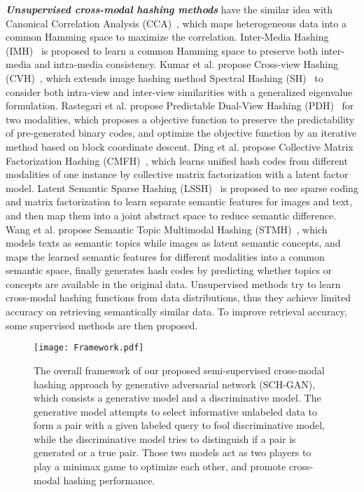 \documentclass[journal]{IEEEtran}
\begin{document}
\textit{\textbf{Unsupervised cross-modal hashing methods}} have the similar idea with Canonical Correlation Analysis (CCA)~\cite{cca}, which maps heterogeneous data into a common Hamming space to maximize the correlation. Inter-Media Hashing (IMH)~\cite{imh} is proposed to learn a common Hamming space to preserve both inter-media and intra-media consistency. Kumar et al. propose Cross-view Hashing (CVH)~\cite{cvh}, which extends image hashing method Spectral Hashing (SH)~\cite{sh_nips} to consider both intra-view and inter-view similarities with a generalized eigenvalue formulation. Rastegari et al. propose Predictable Dual-View Hashing (PDH)~\cite{pdh} for two modalities, which proposes a objective function to preserve the predictability of pre-generated binary codes, and optimize the objective function by an iterative method based on block coordinate descent. Ding et al. propose Collective Matrix Factorization Hashing (CMFH)~\cite{cmfh}, which learns unified hash codes from different modalities of one instance by collective matrix factorization with a latent factor model. Latent Semantic Sparse Hashing (LSSH)~\cite{LLSH} is proposed to use sparse coding and matrix factorization to learn separate semantic features for images and text, and then map them into a joint abstract space to reduce semantic difference. Wang et al. propose Semantic Topic Multimodal Hashing (STMH)~\cite{STMH}, which models texts as semantic topics while images as latent semantic concepts, and maps the learned semantic features for different modalities into a common semantic space, finally generates hash codes by predicting whether topics or concepts are available in the original data. Unsupervised methods try to learn cross-modal hashing functions from data distributions, thus they achieve limited accuracy on retrieving semantically similar data. To improve retrieval accuracy, some supervised methods are then proposed.
\begin{figure*}[!th]
	\centering
	\texttt{[image: Framework.pdf]}
	\caption{The overall framework of our proposed semi-supervised cross-modal hashing approach by generative adversarial network (SCH-GAN), which consists a generative model and a discriminative model. The generative model attempts to select informative unlabeled data to form a pair with a given labeled query to fool discriminative model, while the discriminative model tries to distinguish if a pair is generated or a true pair. Those two models act as two players to play a minimax game to optimize each other, and promote cross-modal hashing performance.}
	\label{framework}
\end{figure*}
\end{document}
